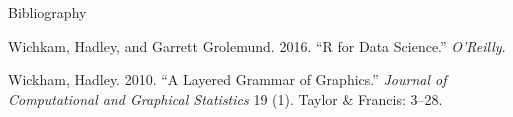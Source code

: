 \documentclass[ignorenonframetext,]{beamer}
\begin{document}
\begin{frame}{Bibliography}
\protect\hypertarget{bibliography}{}

\hypertarget{refs}{}
\leavevmode\hypertarget{ref-wichkam2016r}{}%
Wichkam, Hadley, and Garrett Grolemund. 2016. ``R for Data Science.''
\emph{O'Reilly}.

\leavevmode\hypertarget{ref-wickham2010layered}{}%
Wickham, Hadley. 2010. ``A Layered Grammar of Graphics.'' \emph{Journal
of Computational and Graphical Statistics} 19 (1). Taylor \& Francis:
3--28.

\end{frame}
\end{document}
